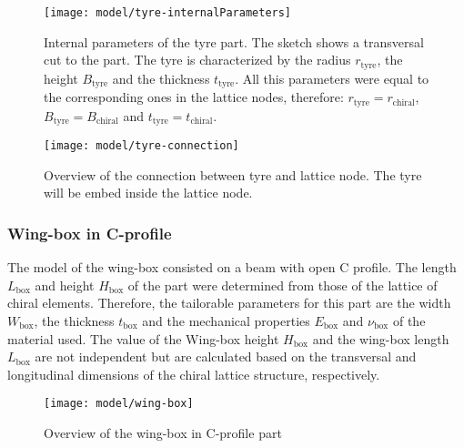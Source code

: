     \begin{figure}[!htpb]
      \centering
      \texttt{[image: model/tyre-internalParameters]}
      \caption[Internal parameters of the tyre part]{Internal parameters of the tyre part. The sketch shows a transversal cut to the part. The tyre is characterized by the radius $r_{\mathrm{tyre}}$, the height $B_{\mathrm{tyre}}$ and the thickness $t_{\mathrm{tyre}}$. All this parameters were equal to the corresponding ones in the lattice nodes, therefore: $r_{\mathrm{tyre}} = r_{\mathrm{chiral}}$, $B_{\mathrm{tyre}} = B_{\mathrm{chiral}}$ and $t_{\mathrm{tyre}} = t_{\mathrm{chiral}}$.}\label{fig:tyre-internalParameters}
    \end{figure}

    \begin{figure}[!htpb]
      \centering
      \texttt{[image: model/tyre-connection]}
      \caption[Overview of the connection between tyre and lattice node]{Overview of the connection between tyre and lattice node. The tyre will be embed inside the lattice node.}\label{fig:tyre-connection}
    \end{figure}

    \clearpage
    \subsubsection{Wing-box in C-profile} \label{subsubsec:wingBox_Parametrization}

    The model of the wing-box consisted on a beam with open C profile. The length $L_{\mathrm{box}}$ and height $H_{\mathrm{box}}$ of the part were determined from those of the lattice of chiral elements. Therefore, the tailorable parameters for this part are the width $W_{\mathrm{box}}$, the thickness $t_{\mathrm{box}}$ and the mechanical properties $E_{\mathrm{box}}$ and $\nu_{\mathrm{box}}$ of the material used. The value of the Wing-box height $H_{\mathrm{box}}$ and the wing-box length $L_{\mathrm{box}}$ are not independent but are calculated based on the transversal and longitudinal dimensions of the chiral lattice structure, respectively.

    \begin{figure}[!htpb]
      \centering
      \texttt{[image: model/wing-box]}
      \caption[Overview of the wing-box in C-profile part]{Overview of the wing-box in C-profile part}\label{fig:wing-box}
    \end{figure}


